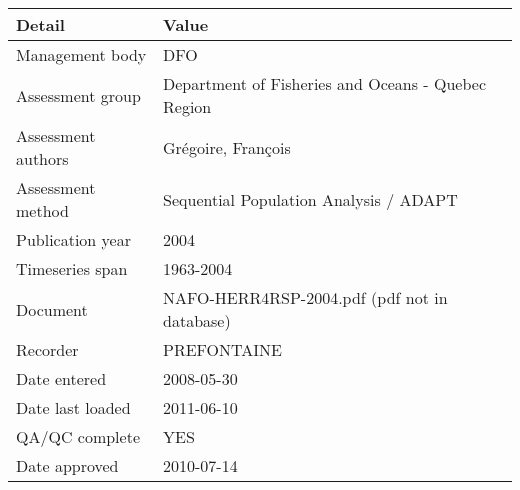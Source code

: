 \begin{table}[htb]
\centering
\begin{tabular}{lp{7cm}}
\toprule
Detail & Value \\
\midrule
Management body    & DFO                                                \\
Assessment group   & Department of Fisheries and Oceans - Quebec Region \\
Assessment authors & Gr\'{e}goire, Fran\c{c}ois                         \\
Assessment method  & Sequential Population Analysis / ADAPT             \\
Publication year   & 2004                                               \\
Timeseries span    & 1963-2004                                          \\
Document           & NAFO-HERR4RSP-2004.pdf (pdf not in database)       \\
Recorder           & PREFONTAINE                                        \\
Date entered       & 2008-05-30                                         \\
Date last loaded   & 2011-06-10                                         \\
QA/QC complete     & YES                                                \\
Date approved      & 2010-07-14                                         \\
\bottomrule
\end{tabular}
\label{tab:assessdet}
\end{table}
